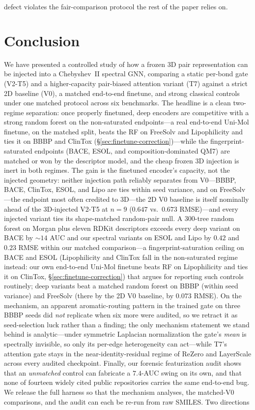 \documentclass[sigconf,nonacm,anonymous,review]{acmart}
\begin{document}
defect violates the fair-comparison protocol the rest of the paper relies on.

\section{Conclusion}
\label{sec:conclusion}

We have presented a controlled study of how a frozen 3D pair representation can be injected into a Chebyshev~II spectral GNN, comparing a static per-bond gate (V2-T5) and a higher-capacity pair-biased attention variant (T7) against a strict 2D baseline (V0), a matched end-to-end finetune, and strong classical controls under one matched protocol across six benchmarks. The headline is a clean two-regime separation: once properly finetuned, deep encoders are competitive with a strong random forest on the non-saturated endpoints---a real end-to-end Uni-Mol finetune, on the matched split, beats the RF on FreeSolv and Lipophilicity and ties it on BBBP and ClinTox (\S\ref{sec:finetune-correction})---while the fingerprint-saturated endpoints (BACE, ESOL, and composition-dominated QM7) are matched or won by the descriptor model, and the cheap frozen 3D injection is inert in both regimes. The gain is the finetuned encoder's capacity, not the injected geometry: neither injection path reliably separates from V0---BBBP, BACE, ClinTox, ESOL, and Lipo are ties within seed variance, and on FreeSolv---the endpoint most often credited to 3D---the 2D V0 baseline is itself nominally ahead of the 3D-injected V2-T5 at $n{=}9$ ($0.647$ vs.\ $0.673$ RMSE)---and every injected variant ties its shape-matched random-pair null. A 300-tree random forest on Morgan plus eleven RDKit descriptors exceeds every deep variant on BACE by $\sim$$14$ AUC and our spectral variants on ESOL and Lipo by $0.42$ and $0.23$ RMSE within our matched comparison---a fingerprint-saturation ceiling on BACE and ESOL (Lipophilicity and ClinTox fall in the non-saturated regime instead: our own end-to-end Uni-Mol finetune beats RF on Lipophilicity and ties it on ClinTox, \S\ref{sec:finetune-correction}) that argues for reporting such controls routinely; deep variants beat a matched random forest on BBBP (within seed variance) and FreeSolv (there by the 2D V0 baseline, by $0.073$ RMSE). On the mechanism, an apparent aromatic-routing pattern in the trained gate on three BBBP seeds did \emph{not} replicate when six more were audited, so we retract it as seed-selection luck rather than a finding; the only mechanism statement we stand behind is analytic---under symmetric Laplacian normalization the gate's \emph{mean} is spectrally invisible, so only its per-edge heterogeneity can act---while T7's attention gate stays in the near-identity-residual regime of ReZero and LayerScale across every audited checkpoint. Finally, our forensic featurization audit shows that an \emph{unmatched} control can fabricate a $7.4$-AUC swing on its own, and that none of fourteen widely cited public repositories carries the same end-to-end bug. We release the full harness so that the mechanism analyses, the matched-V0 comparisons, and the audit can each be re-run from raw SMILES. Two directions 
\end{document}
